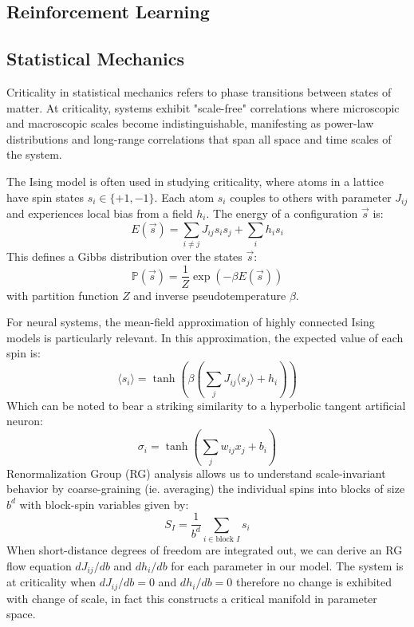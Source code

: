 \subsection{Reinforcement Learning}

\subsection{Statistical Mechanics}

Criticality in statistical mechanics refers to phase transitions between states of matter. At criticality, systems exhibit "scale-free" correlations where microscopic and macroscopic scales become indistinguishable, manifesting as power-law distributions and long-range correlations that span all space and time scales of the system.

The Ising model is often used in studying criticality, where atoms in a lattice have spin states $s_i \in \{+1, -1\}$. Each atom $s_i$ couples to others with parameter $J_{ij}$ and experiences local bias from a field $h_i$. The energy of a configuration $\vec{s}$ is:
\begin{equation}E(\vec{s}) = \sum_{i\neq j} J_{ij} s_is_j + \sum_i h_is_i\end{equation}
This defines a Gibbs distribution over the states $\vec{s}$:
\begin{equation}\mathbb{P}(\vec{s})=\dfrac{1}{Z}\exp(-\beta E(\vec{s}))\end{equation}
with partition function $Z$ and inverse pseudotemperature $\beta$.

For neural systems, the mean-field approximation of highly connected Ising models is particularly relevant. In this approximation, the expected value of each spin is:
\begin{equation}
\langle s_i \rangle = \tanh(\beta(\sum_j J_{ij}\langle s_j \rangle + h_i))
\end{equation}
Which can be noted to bear a striking similarity to a hyperbolic tangent artificial neuron:
\begin{equation}
\sigma_i = \tanh(\sum_j w_{ij}x_j + b_i)
\end{equation}
Renormalization Group (RG) analysis allows us to understand scale-invariant behavior by coarse-graining (ie. averaging) the individual spins into blocks of size $b^d$ with block-spin variables given by:
\begin{equation}
S_I = \frac{1}{b^d}\sum_{i \in \text{block } I} s_i
\end{equation} When short-distance degrees of freedom are integrated out, we can derive an RG flow equation $dJ_{ij}/db$ and $dh_i/db$ for each parameter in our model. The system is at criticality when $dJ_{ij}/db=0$ and $dh_i/db=0$ therefore no change is exhibited with change of scale, in fact this constructs a critical manifold in parameter space.

